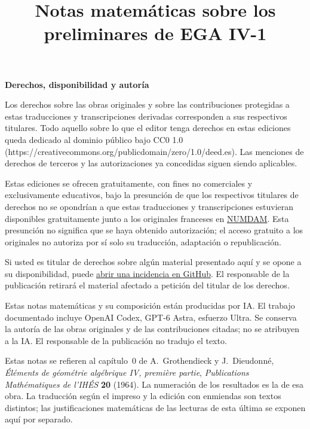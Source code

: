 \documentclass[11pt,a4paper]{article}
\title{Notas matemáticas sobre los preliminares de EGA IV-1}
\author{}
\date{}
\begin{document}
\begingroup
\small
\noindent\textbf{Derechos, disponibilidad y autoría}

Los derechos sobre las obras originales y sobre las contribuciones protegidas a estas traducciones y transcripciones derivadas corresponden a sus respectivos titulares. Todo aquello sobre lo que el editor tenga derechos en estas ediciones queda dedicado al dominio público bajo CC0 1.0 (https://creativecommons.org/publicdomain/zero/1.0/deed.es). Las menciones de derechos de terceros y las autorizaciones ya concedidas siguen siendo aplicables.

Estas ediciones se ofrecen gratuitamente, con fines no comerciales y exclusivamente educativos, bajo la presunción de que los respectivos titulares de derechos no se opondrían a que estas traducciones y transcripciones estuvieran disponibles gratuitamente junto a los originales franceses en \href{https://www.numdam.org/}{NUMDAM}. Esta presunción no significa que se haya obtenido autorización; el acceso gratuito a los originales no autoriza por sí solo su traducción, adaptación o republicación.

Si usted es titular de derechos sobre algún material presentado aquí y se opone a su disponibilidad, puede \href{https://github.com/KokunoYumeto/ega-fga-es/issues}{abrir una incidencia en GitHub}. El responsable de la publicación retirará el material afectado a petición del titular de los derechos.

Estas notas matemáticas y su composición están producidas por IA. El trabajo documentado incluye OpenAI Codex, GPT-6 Astra, esfuerzo Ultra. Se conserva la autoría de las obras originales y de las contribuciones citadas; no se atribuyen a la IA. El responsable de la publicación no tradujo el texto.
\par
\endgroup
\clearpage

\maketitle
Estas notas se refieren al capítulo~0 de A.~Grothendieck y J.~Dieudonné,
\emph{Éléments de géométrie algébrique IV, première partie},
\emph{Publications Mathématiques de l'IHÉS} \textbf{20} (1964).
La numeración de los resultados es la de esa obra. La traducción según el
impreso y la edición con enmiendas son textos distintos; las justificaciones
matemáticas de las lecturas de esta última se exponen aquí por separado.
\end{document}
